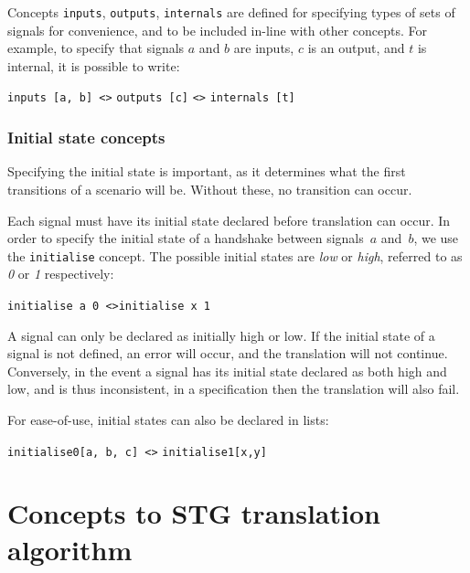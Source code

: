 \documentclass[british,conference,compsoc]{IEEEtran}
\begin{document}
Concepts \texttt{inputs}, \texttt{outputs}, \texttt{internals} are defined for
specifying types of sets of signals for convenience, and to be included in-line
with other concepts. For example, to specify that signals $a$ and $b$ are 
inputs, $c$ is an output, and $t$ is internal, it is possible to write:

\begin{center}
\texttt{inputs [a, b] <>} \texttt{outputs [c]} \texttt{<>} \texttt{internals [t]}
\end{center}

\vspace{-4mm}

\subsubsection{Initial state concepts\label{sub:initState}}

Specifying the initial state is important, as it determines what the first 
transitions of a scenario will be. Without these, no transition can occur.

Each signal must have its initial state declared before translation can occur. 
In order to specify the initial state of a handshake between signals~$a$
and~$b$, we use the \texttt{initialise} concept.
The possible initial states are \emph{low} or \emph{high}, referred to as 
\emph{0} or \emph{1} respectively:

\begin{center}
   \texttt{initialise a 0 <>}\texttt{initialise x 1}
\end{center}

\noindent A signal can only be declared as initially high or low. If the 
initial state of a signal is not defined, an error will occur, and the 
translation will not continue. Conversely, in the event a signal has its 
initial state declared as both high and low, and is thus inconsistent, in a 
specification then the translation will also fail.

For ease-of-use, initial states can also be declared in lists:

\begin{center}
\texttt{initialise0[a, b, c] <>} \texttt{initialise1[x,y]}
\end{center}

\vspace{-2mm}

\section{Concepts to STG translation algorithm\label{sec:algorithm}}
\end{document}
